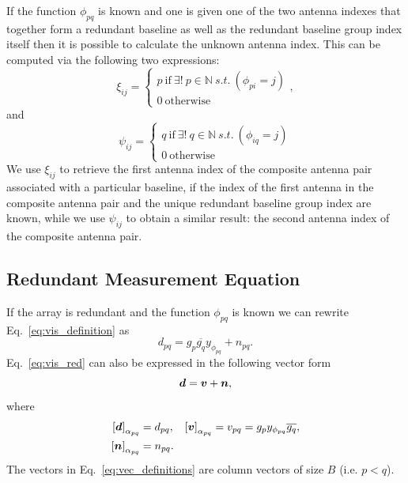 \documentclass[useAMS,usenatbib]{mn2e}
\newcommand{\bd}{\bmath{d}}
\newcommand{\bv}{\bmath{v}}
\newcommand{\bn}{\bmath{n}}
\newcommand{\conj}[1]{\overline{#1}}
\begin{document}
If the function $\phi_{pq}$ is known and one is given one of the two antenna indexes that together form a redundant baseline as well as the redundant baseline group index itself then it is possible 
to calculate the unknown antenna index. This can be computed via the following two expressions:
\begin{equation}
\xi_{ij} = 
\begin{cases}
p~\textrm{if}~\exists! ~ p \in \mathbb{N} ~ s.t. ~(\phi_{pi} = j)\\
0~\textrm{otherwise}
\end{cases},
\end{equation}
and
\begin{equation}
\psi_{ij} = 
\begin{cases}
q~\textrm{if}~\exists! ~ q \in \mathbb{N} ~ s.t. ~(\phi_{iq} = j)\\
0~\textrm{otherwise}
\end{cases}
\end{equation}
We use $\xi_{ij}$ to retrieve the first antenna index of the composite antenna pair associated with a particular baseline, if the index of the first antenna in the composite antenna pair and the unique redundant baseline group index are known, while we use $\psi_{ij}$ to obtain 
a similar result: the second antenna index of the composite antenna pair. %

\subsection{Redundant Measurement Equation}
\label{sec:r_mes}
If the array is redundant and the function $\phi_{pq}$ is known we can rewrite Eq.~\eqref{eq:vis_definition} as
\begin{equation}
\label{eq:vis_red}
d_{pq} = g_{p}\conj{g_q}y_{\phi_{pq}} + n_{pq}.
\end{equation}
Eq.~\eqref{eq:vis_red} can also be expressed in the following vector form 
\begin{equation}
\label{eq:vis_red_vec}
\bd = \bv + \bn, 
\end{equation}
where 
\begin{align}
 \left [ \bd \right]_{\alpha_{pq}} &= d_{pq}, & \left [ \bv \right ]_{\alpha_{pq}} &= v_{pq}=g_p y_{\phi_{pq}} \conj{g_q},\nonumber\\
 \left [ \bn \right ]_{\alpha_{pq}} &= n_{pq}. &  &\label{eq:vec_definitions}
\end{align}
The vectors in Eq.~\eqref{eq:vec_definitions} are column vectors of size $B$ (i.e. $p<q$).
\end{document}
